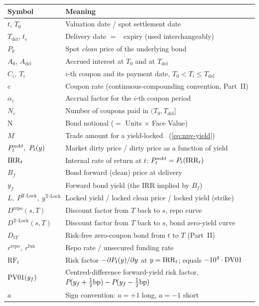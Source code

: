 \documentclass[11pt,a4paper]{article}
\newcommand{\Tlock}{\text{T-Lock}}
\newcommand{\RF}{\mathrm{RF}}
\newcommand{\Drepo}{D^{\mathrm{repo}}}
\newcommand{\Dtl}{D^{\Tlock}}
\newcommand{\Tdel}{T_{\mathrm{del}}}
\newcommand{\Adel}{A_{\mathrm{del}}}
\newcommand{\Ptl}{P^{\Tlock}}
\newcommand{\ytl}{y^{\Tlock}}
\newcommand{\Bf}{B_f}
\newcommand{\rrepo}{r^{\mathrm{repo}}}
\newcommand{\rfun}{r^{\mathrm{fun}}}
\newcommand{\Ncp}{N_{c}}        %
\begin{document}
\begin{center}
\renewcommand{\arraystretch}{1.12}
\begin{tabular}{@{}p{3cm}p{11.5cm}@{}}
\toprule
\textbf{Symbol} & \textbf{Meaning} \\
\midrule
$t$, $T_0$        & Valuation date / spot settlement date \\
$\Tdel$, $t_e$    & Delivery date $=$ \Tlock\ expiry (used interchangeably) \\
$P_0$             & Spot \emph{clean} price of the underlying bond \\
$A_0$, $\Adel$    & Accrued interest at $T_0$ and at $\Tdel$ \\
$C_i,\ T_i$       & $i$-th coupon and its payment date, $T_0 < T_i \le \Tdel$ \\
$c$               & Coupon rate (continuous-compounding convention, Part~II) \\
$\alpha_i$        & Accrual factor for the $i$-th coupon period \\
$\Ncp$            & Number of coupons paid in $(T_0, \Tdel]$ \\
$\mathrm{N}$      & Bond notional ($=$ Units $\times$ Face Value) \\
$M$               & Trade amount for a yield-locked \Tlock\ (\eqref{eq:npv-yield}) \\
$P^{mkt}_t,\ \Bond{t}{y}$ & Market dirty price / dirty price as a function of yield \\
$\mathrm{IRR}_t$          & Internal rate of return at $t$: $P^{mkt}_t = P_{t}(\mathrm{IRR}_t)$ \\
$\Bf$             & Bond forward (clean) price at delivery \\
$y_f$             & Forward bond yield (the IRR implied by $\Bf$) \\
$L,\ \Ptl,\ \ytl$ & Locked yield / locked clean price / locked yield (strike) \\
$\Drepo(s, T)$    & Discount factor from $T$ back to $s$, repo curve \\
$\Dtl(s, T)$      & Discount factor from $T$ back to $s$, bond zero-yield curve \\
$D_{tT}$          & Risk-free zero-coupon bond from $t$ to $T$ (Part~II) \\
$\rrepo,\ \rfun$  & Repo rate / unsecured funding rate \\
$\RF_t$           & Risk factor $-\partial P_{t}(y)/\partial y$ at $y=\mathrm{IRR}_t$; equals $-10^4 \cdot \mathrm{DV01}$ \\
$\mathrm{PV01}(y_f)$     & Centred-difference forward-yield risk factor,
                    $P_{}(y_f + \tfrac12\text{bp}) - P_{}(y_f - \tfrac12\text{bp})$ \\
$a$               & Sign convention: $a=+1$ long, $a=-1$ short \\
\bottomrule
\end{tabular}
\end{center}
\end{document}
